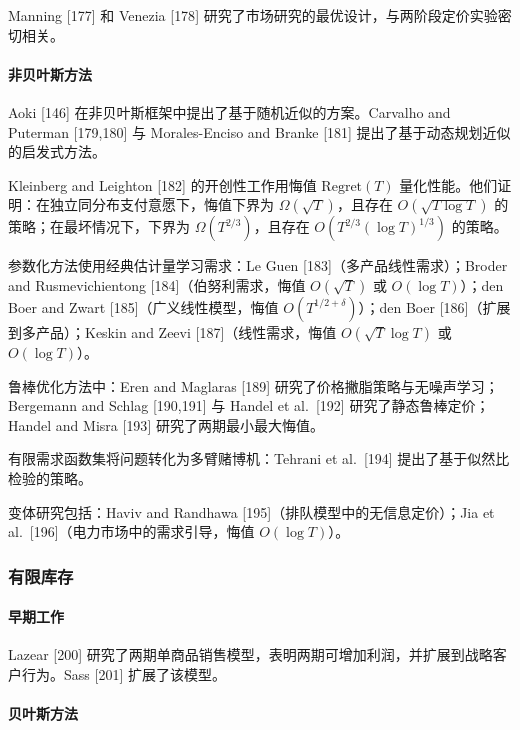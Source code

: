 Manning {[}177{]} 和 Venezia {[}178{]} 研究了市场研究的最优设计，与两阶段定价实验密切相关。

\paragraph{非贝叶斯方法}\label{non-bayesian-approaches}

Aoki {[}146{]} 在非贝叶斯框架中提出了基于随机近似的方案。Carvalho and Puterman {[}179,180{]} 与 Morales-Enciso and Branke {[}181{]} 提出了基于动态规划近似的启发式方法。

Kleinberg and Leighton {[}182{]} 的开创性工作用悔值 \(\mathrm{Regret}(T)\) 量化性能。他们证明：在独立同分布支付意愿下，悔值下界为 \(\Omega(\sqrt{T})\)，且存在 \(O(\sqrt{T\log T})\) 的策略；在最坏情况下，下界为 \(\Omega(T^{2/3})\)，且存在 \(O(T^{2/3}(\log T)^{1/3})\) 的策略。

参数化方法使用经典估计量学习需求：Le Guen {[}183{]}（多产品线性需求）；Broder and Rusmevichientong {[}184{]}（伯努利需求，悔值 \(O(\sqrt{T})\) 或 \(O(\log T)\)）；den Boer and Zwart {[}185{]}（广义线性模型，悔值 \(O(T^{1/2 + \delta})\)）；den Boer {[}186{]}（扩展到多产品）；Keskin and Zeevi {[}187{]}（线性需求，悔值 \(O(\sqrt{T} \log T)\) 或 \(O(\log T)\)）。

鲁棒优化方法中：Eren and Maglaras {[}189{]} 研究了价格撇脂策略与无噪声学习；Bergemann and Schlag {[}190,191{]} 与 Handel et al.~{[}192{]} 研究了静态鲁棒定价；Handel and Misra {[}193{]} 研究了两期最小最大悔值。

有限需求函数集将问题转化为多臂赌博机：Tehrani et al.~{[}194{]} 提出了基于似然比检验的策略。

变体研究包括：Haviv and Randhawa {[}195{]}（排队模型中的无信息定价）；Jia et al.~{[}196{]}（电力市场中的需求引导，悔值 \(O(\log T)\)）。

\subsubsection{有限库存}\label{finite-inventory}

\paragraph{早期工作}\label{early-work-1}

Lazear {[}200{]} 研究了两期单商品销售模型，表明两期可增加利润，并扩展到战略客户行为。Sass {[}201{]} 扩展了该模型。

\paragraph{贝叶斯方法}\label{bayesian-approaches-1}

